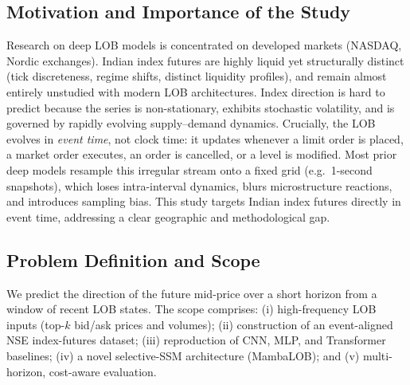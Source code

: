 \documentclass[11pt]{article}
\begin{document}
\subsection{Motivation and Importance of the Study}
Research on deep LOB models is concentrated on developed markets (NASDAQ, Nordic exchanges). Indian index
futures are highly liquid yet structurally distinct (tick discreteness, regime shifts, distinct liquidity
profiles), and remain almost entirely unstudied with modern LOB architectures. Index direction is hard to
predict because the series is non-stationary, exhibits stochastic volatility, and is governed by rapidly
evolving supply--demand dynamics. Crucially, the LOB evolves in \emph{event time}, not clock time: it
updates whenever a limit order is placed, a market order executes, an order is cancelled, or a level is
modified. Most prior deep models resample this irregular stream onto a fixed grid (e.g.\ 1-second
snapshots), which loses intra-interval dynamics, blurs microstructure reactions, and introduces sampling
bias. This study targets Indian index futures directly in event time, addressing a clear geographic and
methodological gap.

\subsection{Problem Definition and Scope}
We predict the direction of the future mid-price over a short horizon from a window of recent LOB states.
The scope comprises: (i) high-frequency LOB inputs (top-$k$ bid/ask prices and volumes); (ii) construction
of an event-aligned NSE index-futures dataset; (iii) reproduction of CNN, MLP, and Transformer baselines;
(iv) a novel selective-SSM architecture (MambaLOB); and (v) multi-horizon, cost-aware evaluation.
\end{document}
